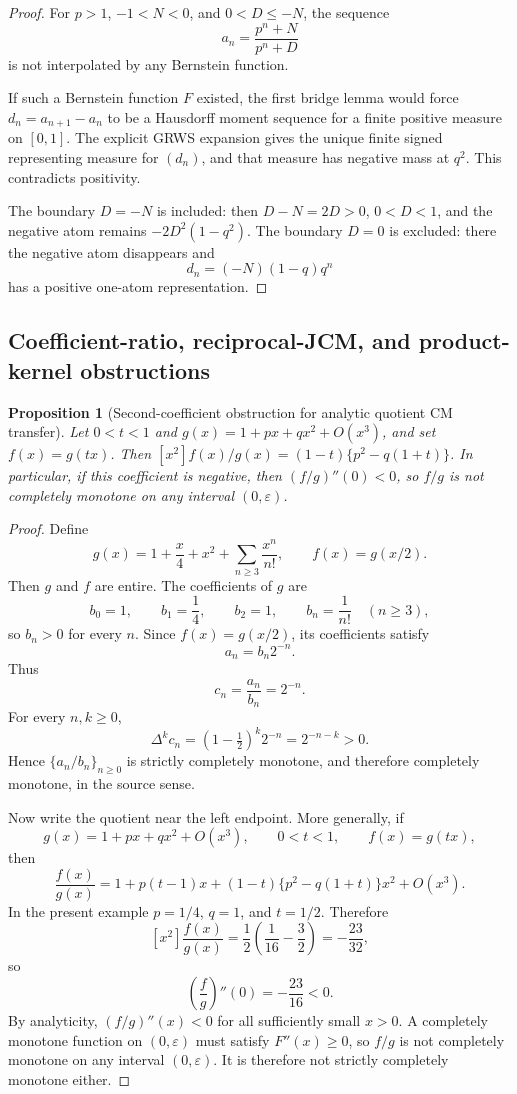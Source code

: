 \documentclass[11pt]{article}
\numberwithin{equation}{section}
\newtheorem{proposition}[theorem]{Proposition}
\theoremstyle{definition}
\theoremstyle{remark}
\newcommand{\1}{\mathbf 1}
\begin{document}
\begin{proof}
For \(p>1\), \(-1<N<0\), and \(0<D\le -N\), the sequence
\[
a_n=\frac{p^n+N}{p^n+D}
\]
is not interpolated by any Bernstein function.

If such a Bernstein function \(F\) existed, the first bridge lemma would force \(d_n=a_{n+1}-a_n\) to be a Hausdorff moment sequence for a finite positive measure on \([0,1]\). The explicit GRWS expansion gives the unique finite signed representing measure for \((d_n)\), and that measure has negative mass at \(q^2\). This contradicts positivity.

The boundary \(D=-N\) is included: then \(D-N=2D>0\), \(0<D<1\), and the negative atom remains \(-2D^2(1-q^2)\). The boundary \(D=0\) is excluded: there the negative atom disappears and
\[
d_n=(-N)(1-q)q^n
\]
has a positive one-atom representation.
\end{proof}

\subsection{Coefficient-ratio, reciprocal-JCM, and product-kernel obstructions}
\begin{proposition}[Second-coefficient obstruction for analytic quotient CM transfer]
\label{res:baricz-analyticquotient-secondcoefficientobstruction}
Let \(0<t<1\) and \(g(x)=1+px+qx^2+O(x^3)\), and set \(f(x)=g(tx)\). Then \([x^2]f(x)/g(x)=(1-t)\{p^2-q(1+t)\}\). In particular, if this coefficient is negative, then \((f/g)''(0)<0\), so \(f/g\) is not completely monotone on any interval \((0,\varepsilon)\).
\end{proposition}

\begin{proof}
Define
\[
g(x)=1+\frac{x}{4}+x^2+\sum_{n\ge3}\frac{x^n}{n!},
\qquad
f(x)=g(x/2).
\]
Then \(g\) and \(f\) are entire. The coefficients of \(g\) are
\[
b_0=1,\qquad b_1=\frac14,\qquad b_2=1,\qquad b_n=\frac1{n!}\quad(n\ge3),
\]
so \(b_n>0\) for every \(n\). Since \(f(x)=g(x/2)\), its coefficients satisfy
\[
a_n=b_n2^{-n}.
\]
Thus
\[
c_n=\frac{a_n}{b_n}=2^{-n}.
\]
For every \(n,k\ge0\),
\[
\Delta^k c_n=(1-\tfrac12)^k2^{-n}=2^{-n-k}>0.
\]
Hence \(\{a_n/b_n\}_{n\ge0}\) is strictly completely monotone, and therefore completely monotone, in the source sense.

Now write the quotient near the left endpoint. More generally, if
\[
g(x)=1+px+qx^2+O(x^3),\qquad 0<t<1,\qquad f(x)=g(tx),
\]
then
\[
\frac{f(x)}{g(x)}
=1+p(t-1)x+(1-t)\{p^2-q(1+t)\}x^2+O(x^3).
\]
In the present example \(p=1/4\), \(q=1\), and \(t=1/2\). Therefore
\[
[x^2]\frac{f(x)}{g(x)}
=\frac12\left(\frac1{16}-\frac32\right)
=-\frac{23}{32},
\]
so
\[
\left(\frac{f}{g}\right)''(0)=-\frac{23}{16}<0.
\]
By analyticity, \((f/g)''(x)<0\) for all sufficiently small \(x>0\). A completely monotone function on \((0,\varepsilon)\) must satisfy \(F''(x)\ge0\), so \(f/g\) is not completely monotone on any interval \((0,\varepsilon)\). It is therefore not strictly completely monotone either.
\end{proof}
\end{document}
